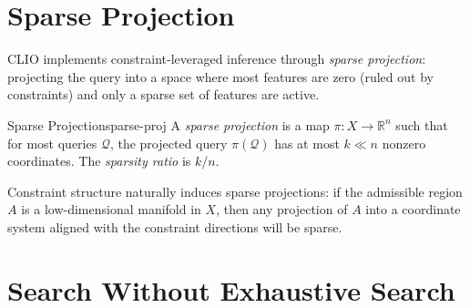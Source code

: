 \section{Sparse Projection}

CLIO implements constraint-leveraged inference through \emph{sparse
projection}: projecting the query into a space where most features
are zero (ruled out by constraints) and only a sparse set of features
are active.

\begin{definition}{Sparse Projection}{sparse-proj}
  A \emph{sparse projection} is a map $\pi : X \to \mathbb{R}^n$ such
  that for most queries $\mathcal{Q}$, the projected query
  $\pi(\mathcal{Q})$ has at most $k \ll n$ nonzero coordinates.
  The \emph{sparsity ratio} is $k/n$.
\end{definition}

Constraint structure naturally induces sparse projections: if the
admissible region $A$ is a low-dimensional manifold in $X$, then any
projection of $A$ into a coordinate system aligned with the constraint
directions will be sparse.

\section{Search Without Exhaustive Search}

